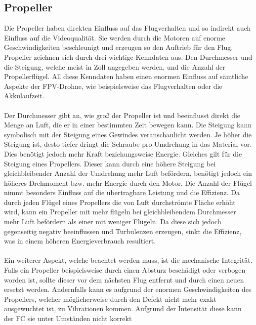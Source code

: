     \subsection[Propeller]{Propeller}
        Die Propeller haben direkten Einfluss auf das Flugverhalten und so indirekt auch Einfluss auf
        die Videoqualität. Sie werden durch die Motoren auf enorme Geschwindigkeiten beschleunigt und
        erzeugen so den Auftrieb für den Flug. Propeller zeichnen sich durch drei wichtige Kenndaten
        aus. Den Durchmesser und die Steigung, welche meist in Zoll angegeben werden, und die Anzahl
        der Propellerflügel. All diese Kenndaten haben einen enormen Einfluss auf sämtliche Aspekte der
        FPV-Drohne, wie beispielsweise das Flugverhalten oder die Akkulaufzeit. \\
        \\
        Der Durchmesser gibt an, wie groß der Propeller ist und beeinflusst direkt die Menge an Luft,
        die er in einer bestimmten Zeit bewegen kann. Die Steigung kann symbolisch mit der Steigung
        eines Gewindes veranschaulicht werden. Je höher die Steigung ist, desto tiefer dringt die Schraube
        pro Umdrehung in das Material vor. Dies benötigt jedoch mehr Kraft beziehungsweise Energie. Gleiches
        gilt für die Steigung eines Propellers. Dieser kann durch eine höhere Steigung bei gleichbleibender
        Anzahl der Umdrehung mehr Luft befördern, benötigt jedoch ein höheres Drehmoment bzw. mehr Energie
        durch den Motor. Die Anzahl der Flügel nimmt besonders Einfluss auf die übertragbare Leistung und
        die Effizienz. Da durch jeden Flügel eines Propellers die von Luft durchströmte Fläche erhöht wird,
        kann ein Propeller mit mehr flügeln bei gleichbleibendem Durchmesser mehr Luft befördern als einer
        mit weniger Flügeln. Da diese sich jedoch gegenseitig negativ beeinflussen und Turbulenzen erzeugen,
        sinkt die Effizienz, was in einem höheren Energieverbrauch resultiert.  \\
        \\
        Ein weiterer Aspekt, welche beachtet werden muss, ist die mechanische Integrität. Falls ein Propeller
        beispielsweise durch einen Absturz beschädigt oder verbogen worden ist, sollte dieser vor dem nächsten
        Flug entfernt und durch einen neuen ersetzt werden. Andernfalls kann es aufgrund der enormen
        Geschwindigkeiten des Propellers, welcher möglicherweise durch den Defekt nicht mehr exakt ausgewuchtet
        ist, zu Vibrationen kommen. Aufgrund der Intensität diese kann der FC sie unter Umständen nicht korrekt

